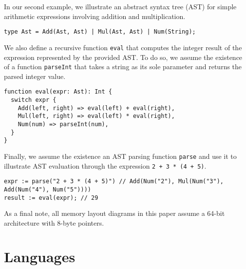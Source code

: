 \documentclass[12pt, letterpaper]{article}
\begin{document}
In our second example, we illustrate an abstract syntax tree (AST) for simple arithmetic expressions involving addition and multiplication.
\begin{verbatim}
type Ast = Add(Ast, Ast) | Mul(Ast, Ast) | Num(String);
\end{verbatim}
We also define a recursive function \texttt{eval} that computes the integer result of the expression represented by the provided AST. To do so, we assume the existence of a function \texttt{parseInt} that takes a string as its sole parameter and returns the parsed integer value.
\begin{verbatim}
function eval(expr: Ast): Int {
  switch expr {
    Add(left, right) => eval(left) + eval(right),
    Mul(left, right) => eval(left) * eval(right),
    Num(num) => parseInt(num),
  }
}
\end{verbatim}
Finally, we assume the existence an AST parsing function \texttt{parse} and use it to illustrate AST evaluation through the expression \texttt{2 + 3 * (4 + 5)}.
\begin{verbatim}
expr := parse("2 + 3 * (4 + 5)") // Add(Num("2"), Mul(Num("3"), Add(Num("4"), Num("5"))))
result := eval(expr); // 29
\end{verbatim}

As a final note, all memory layout diagrams in this paper assume a 64-bit architecture with 8-byte pointers.

\section{Languages}
\end{document}
